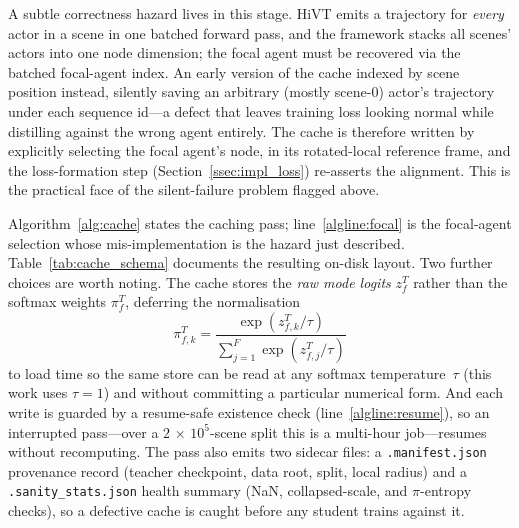 A subtle correctness hazard lives in this stage. HiVT emits a trajectory for
\emph{every} actor in a scene in one batched forward pass, and the framework stacks
all scenes' actors into one node dimension; the focal agent must be recovered via
the batched focal-agent index. An early version of the cache indexed by scene
position instead, silently saving an arbitrary (mostly scene-0) actor's trajectory
under each sequence id---a defect that leaves training loss looking normal while
distilling against the wrong agent entirely. The cache is therefore written by
explicitly selecting the focal agent's node, in its rotated-local reference frame,
and the loss-formation step (Section~\ref{ssec:impl_loss}) re-asserts the
alignment. This is the practical face of the silent-failure problem flagged above.

Algorithm~\ref{alg:cache} states the caching pass; line~\ref{algline:focal} is the
focal-agent selection whose mis-implementation is the hazard just described.
Table~\ref{tab:cache_schema} documents the resulting on-disk layout. Two further
choices are worth noting. The cache stores the \emph{raw mode logits} $z^T_f$ rather
than the softmax weights $\pi^T_f$, deferring the normalisation 
\begin{equation}
  \pi^T_{f,k} = \frac{\exp(z^T_{f,k}/\tau)}{\sum_{j=1}^{F}\exp(z^T_{f,j}/\tau)}
  \label{eq:softmax-temp}
\end{equation}
to load time so the
same store can be read at any softmax temperature~$\tau$ (this work uses
$\tau{=}1$) and without committing a particular numerical form. And each write is guarded by 
a resume-safe existence
check (line~\ref{algline:resume}), so an interrupted pass---over a
$2\,{\times}\,10^5$-scene split this is a multi-hour job---resumes without
recomputing. The pass also emits two sidecar files: a \texttt{.manifest.json}
provenance record (teacher checkpoint, data root, split, local radius) and a
\texttt{.sanity\_stats.json} health summary (NaN, collapsed-scale, and
$\pi$-entropy checks), so a defective cache is caught before any student trains
against it.

